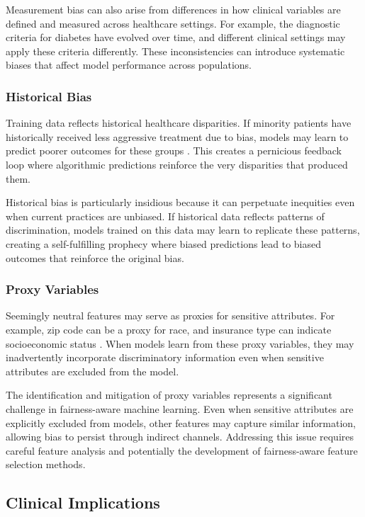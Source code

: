 Measurement bias can also arise from differences in how clinical variables 
are defined and measured across healthcare settings. For example, the 
diagnostic criteria for diabetes have evolved over time, and different 
clinical settings may apply these criteria differently. These inconsistencies 
can introduce systematic biases that affect model performance across 
populations.

\subsubsection{Historical Bias}

Training data reflects historical healthcare disparities. If minority 
patients have historically received less aggressive treatment due to bias, 
models may learn to predict poorer outcomes for these groups \cite{fries2019}. 
This creates a pernicious feedback loop where algorithmic predictions 
reinforce the very disparities that produced them.

Historical bias is particularly insidious because it can perpetuate 
inequities even when current practices are unbiased. If historical data 
reflects patterns of discrimination, models trained on this data may 
learn to replicate these patterns, creating a self-fulfilling prophecy 
where biased predictions lead to biased outcomes that reinforce the 
original bias.

\subsubsection{Proxy Variables}

Seemingly neutral features may serve as proxies for sensitive attributes. 
For example, zip code can be a proxy for race, and insurance type can 
indicate socioeconomic status \cite{lum2016}. When models learn from these 
proxy variables, they may inadvertently incorporate discriminatory information 
even when sensitive attributes are excluded from the model.

The identification and mitigation of proxy variables represents a 
significant challenge in fairness-aware machine learning. Even when 
sensitive attributes are explicitly excluded from models, other features 
may capture similar information, allowing bias to persist through indirect 
channels. Addressing this issue requires careful feature analysis and 
potentially the development of fairness-aware feature selection methods.

\subsection{Clinical Implications}

